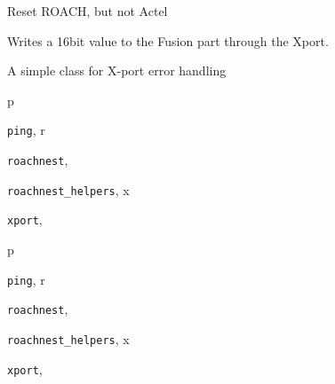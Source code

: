 \documentclass[letterpaper,10pt,english]{sphinxmanual}
\begin{document}
\begin{fulllineitems}
\begin{fulllineitems}
\end{fulllineitems}



\begin{fulllineitems}
\label{index:xport.Xport.warm_rst}
Reset ROACH, but not Actel

\end{fulllineitems}



\begin{fulllineitems}
\label{index:xport.Xport.write}
Writes a 16bit value to the Fusion part through the Xport.

\end{fulllineitems}


\end{fulllineitems}



\begin{fulllineitems}
\label{index:xport.xportError}
A simple class for X-port error handling

\end{fulllineitems}



\renewcommand{\indexname}{Python Module Index}
\begin{theindex}
\def\bigletter#1{{\Large\sffamily#1}\nopagebreak\vspace{1mm}}
\bigletter{p}
\item {\texttt{ping}}, \pageref{index:module-ping}
\indexspace
\bigletter{r}
\item {\texttt{roachnest}}, \pageref{index:module-roachnest}
\item {\texttt{roachnest\_helpers}}, \pageref{index:module-roachnest_helpers}
\indexspace
\bigletter{x}
\item {\texttt{xport}}, \pageref{index:module-xport}
\end{theindex}
\renewcommand{\indexname}{Python Module Index}
\begin{theindex}
\def\bigletter#1{{\Large\sffamily#1}\nopagebreak\vspace{1mm}}
\bigletter{p}
\item {\texttt{ping}}, \pageref{index:module-ping}
\indexspace
\bigletter{r}
\item {\texttt{roachnest}}, \pageref{index:module-roachnest}
\item {\texttt{roachnest\_helpers}}, \pageref{index:module-roachnest_helpers}
\indexspace
\bigletter{x}
\item {\texttt{xport}}, \pageref{index:module-xport}
\end{theindex}

\renewcommand{\indexname}{Index}
\printindex
\end{document}
